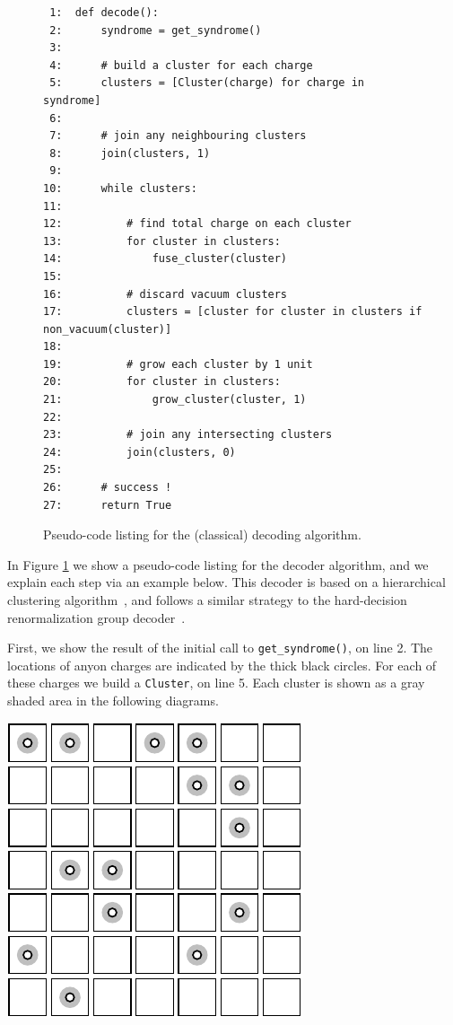 \begin{figure}
\begin{verbatim}
 1:  def decode():
 2:      syndrome = get_syndrome()
 3:      
 4:      # build a cluster for each charge
 5:      clusters = [Cluster(charge) for charge in syndrome]
 6:  
 7:      # join any neighbouring clusters
 8:      join(clusters, 1)
 9:      
10:      while clusters:
11:      
12:          # find total charge on each cluster
13:          for cluster in clusters:
14:              fuse_cluster(cluster)
15:      
16:          # discard vacuum clusters
17:          clusters = [cluster for cluster in clusters if non_vacuum(cluster)]
18:      
19:          # grow each cluster by 1 unit
20:          for cluster in clusters:
21:              grow_cluster(cluster, 1)
22:      
23:          # join any intersecting clusters
24:          join(clusters, 0)
25:  
26:      # success !
27:      return True
\end{verbatim} %
\caption{Pseudo-code listing for the (classical) decoding algorithm.}
\label{PseudoCode}
\end{figure}

In Figure \ref{PseudoCode} we show a pseudo-code listing for the
decoder algorithm,
and we explain each step via an example below.
This decoder is based on
a hierarchical clustering algorithm~\cite{Hastie2009, Wootton2015b},
and follows a similar strategy to
the hard-decision renormalization group decoder~\cite{Bravyi2011}.

\begin{samepage}
First, we show the result of the initial call to {\tt get\_syndrome()}, on line 2.
The locations of anyon charges are indicated by the thick black circles.
For each of these charges we build a {\tt Cluster}, on line 5.
Each cluster is shown as a gray shaded area in the following diagrams.
\begin{center}
\includegraphics[]{pic-decode-0.pdf}
\end{center}
\end{samepage}

